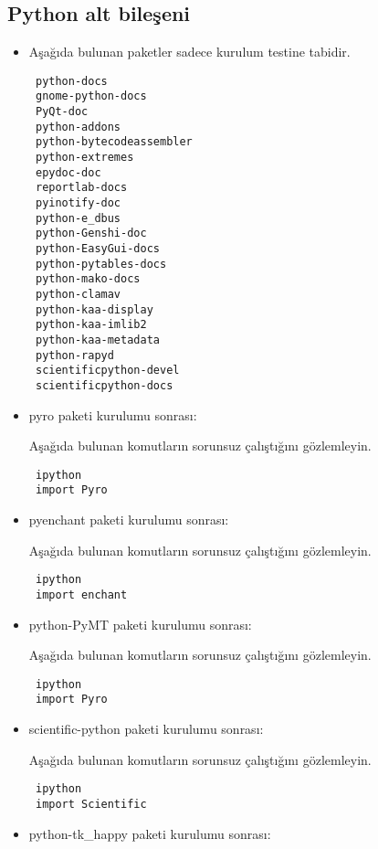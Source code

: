 \documentclass[a4paper,10pt]{article}
\begin{document}
\subsection{Python alt bileşeni}
\begin{itemize}

\item Aşağıda bulunan paketler sadece kurulum testine tabidir.
\begin{verbatim}
 python-docs
 gnome-python-docs
 PyQt-doc
 python-addons
 python-bytecodeassembler
 python-extremes
 epydoc-doc
 reportlab-docs
 pyinotify-doc 
 python-e_dbus
 python-Genshi-doc
 python-EasyGui-docs
 python-pytables-docs
 python-mako-docs
 python-clamav
 python-kaa-display
 python-kaa-imlib2
 python-kaa-metadata
 python-rapyd 
 scientificpython-devel
 scientificpython-docs
\end{verbatim}

\item pyro paketi kurulumu sonrası:

Aşağıda bulunan komutların sorunsuz çalıştığını gözlemleyin.

\begin{verbatim}
 ipython
 import Pyro
\end{verbatim}

\item pyenchant paketi kurulumu sonrası:

Aşağıda bulunan komutların sorunsuz çalıştığını gözlemleyin.

\begin{verbatim}
 ipython
 import enchant
\end{verbatim}


\item python-PyMT paketi kurulumu sonrası:

Aşağıda bulunan komutların sorunsuz çalıştığını gözlemleyin.

\begin{verbatim}
 ipython
 import Pyro
\end{verbatim}

\item  scientific-python paketi kurulumu sonrası:

Aşağıda bulunan komutların sorunsuz çalıştığını gözlemleyin.

\begin{verbatim}
 ipython
 import Scientific
\end{verbatim}

\item python-tk\_happy paketi kurulumu sonrası:


\end{itemize}
\end{document}
